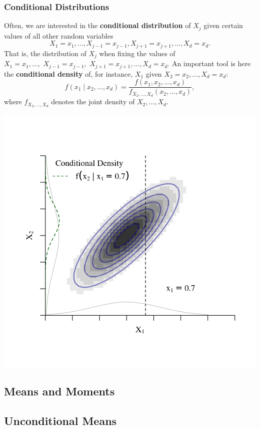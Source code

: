 \documentclass[
  14pt,
]{memoir}
\begin{document}
\hypertarget{condDistr}{%
\subsubsection{Conditional Distributions}\label{condDistr}}

Often, we are interested in the \textbf{conditional distribution} of \(X_j\) given certain values of all other random variables\\
\[X_1=x_1,\ldots, X_{j-1}=x_{j-1}, X_{j+1}=x_{j+1},\ldots,X_d=x_d.\]
That is, the distribution of \(X_j\) when fixing the values of\\
\(X_1=x_1,\ldots,\) \(X_{j-1}=x_{j-1},\) \(X_{j+1}=x_{j+1},\ldots, X_d=x_d\). An important tool is here the \textbf{conditional density} of, for instance, \(X_1\) given \(X_2=x_2,\ldots,X_d=x_d\):
\[
f(x_1\mid x_2,\ldots,x_d)=\frac{f(x_1,x_2,\ldots,x_d)}{f_{X_{2},\ldots,X_{d}}(x_2,\ldots,x_d)},
\]
where \(f_{X_{2},\ldots,X_{d}}\) denotes the joint density of \(X_2,\ldots,X_d\).

\begin{center}\includegraphics[width=0.8\linewidth]{figure/minimal-unnamed-chunk-40-1} \end{center}

\hypertarget{means-and-moments}{%
\subsection{Means and Moments}\label{means-and-moments}}

\hypertarget{unconditional-means}{%
\subsection{Unconditional Means}\label{unconditional-means}}
\end{document}
